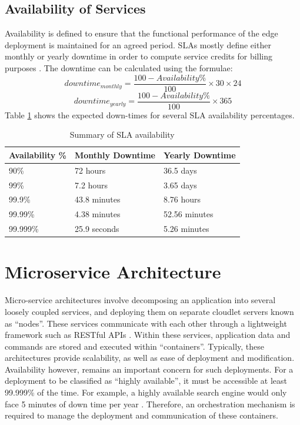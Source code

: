 \subsection{Availability of Services}
\label{subsec:ch2-svc-availability}
Availability is defined to ensure that the functional performance of the edge deployment is maintained for an agreed period. SLAs mostly define either monthly or yearly downtime in order to compute service credits for billing purposes \cite{mirobi2015service}. The downtime can be calculated using the formulae:
\[ downtime_{monthly} = \frac{100 - Availability\%}{100} \times 30 \times 24 \]
\[ downtime_{yearly} = \frac{100 - Availability\%}{100} \times 365 \]
Table \ref{table:sla-availability} shows the expected down-times for several SLA availability percentages.

\begin{table}
    \caption{Summary of SLA availability}\label{table:sla-availability}
    \centering
    \begin{tabular}{|l|l|l|}
        \hline
        Availability \% & Monthly Downtime & Yearly Downtime\\
        \hline
        90\% & 72 hours & 36.5 days\\
        99\% & 7.2 hours & 3.65 days\\
        99.9\% & 43.8 minutes & 8.76 hours\\
        99.99\% & 4.38 minutes & 52.56 minutes\\
        99.999\% & 25.9 seconds & 5.26 minutes\\
        \hline
    \end{tabular}
\end{table}

\section{Microservice Architecture}
\label{sec:ch2-micro-svc-arc}

Micro-service architectures involve decomposing an application into several loosely coupled services, and deploying them on separate cloudlet servers known as ``nodes''. These services communicate with each other through a lightweight framework such as RESTful APIs \cite{li2021understanding}. Within these services, application data and commands are stored and executed within ``containers''. Typically, these architectures provide scalability, as well as ease of deployment and modification. Availability however, remains an important concern for such deployments. For a deployment to be classified as ``highly available'', it must be accessible at least 99.999\% of the time. For example, a highly available search engine would only face 5 minutes of down time per year \cite{nabi2016availability}. Therefore, an orchestration mechanism is required to manage the deployment and communication of these containers.\par

